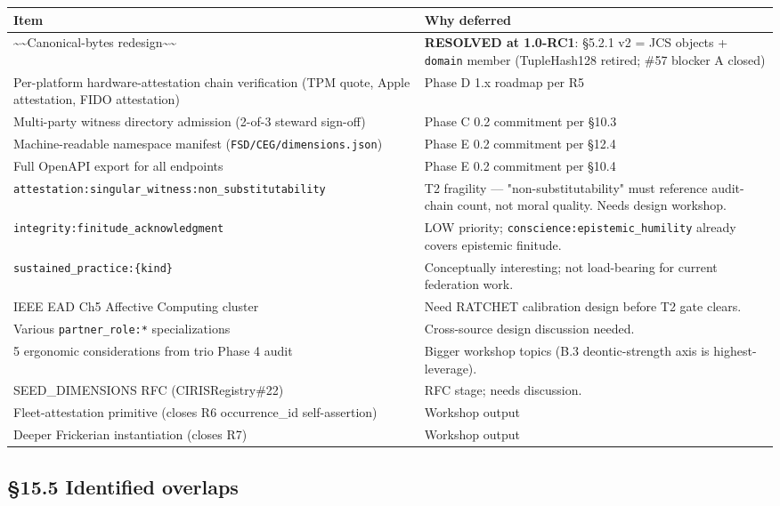 \documentclass[11pt]{article}
\begin{document}
{\footnotesize
\begin{longtable}{|p{8.0cm}|p{8.0cm}|}\hline
\textbf{Item} & \textbf{Why deferred} \\ \hline\endhead
\textasciitilde{}\textasciitilde{}Canonical-bytes redesign\textasciitilde{}\textasciitilde{} & \textbf{RESOLVED at 1.0-RC1}: §5.2.1 v2 = JCS objects + \texttt{domain} member (TupleHash128 retired; \#57 blocker A closed) \\ \hline
Per-platform hardware-attestation chain verification (TPM quote, Apple attestation, FIDO attestation) & Phase D 1.x roadmap per R5 \\ \hline
Multi-party witness directory admission (2-of-3 steward sign-off) & Phase C 0.2 commitment per §10.3 \\ \hline
Machine-readable namespace manifest (\texttt{FSD/CEG/dimensions.json}) & Phase E 0.2 commitment per §12.4 \\ \hline
Full OpenAPI export for all endpoints & Phase E 0.2 commitment per §10.4 \\ \hline
\texttt{attestation:singular\_witness:non\_substitutability} & T2 fragility — "non-substitutability" must reference audit-chain count, not moral quality. Needs design workshop. \\ \hline
\texttt{integrity:finitude\_acknowledgment} & LOW priority; \texttt{conscience:epistemic\_humility} already covers epistemic finitude. \\ \hline
\texttt{sustained\_practice:\{kind\}} & Conceptually interesting; not load-bearing for current federation work. \\ \hline
IEEE EAD Ch5 Affective Computing cluster & Need RATCHET calibration design before T2 gate clears. \\ \hline
Various \texttt{partner\_role:*} specializations & Cross-source design discussion needed. \\ \hline
5 ergonomic considerations from trio Phase 4 audit & Bigger workshop topics (B.3 deontic-strength axis is highest-leverage). \\ \hline
SEED\_DIMENSIONS RFC (CIRISRegistry\#22) & RFC stage; needs discussion. \\ \hline
Fleet-attestation primitive (closes R6 occurrence\_id self-assertion) & Workshop output \\ \hline
Deeper Frickerian instantiation (closes R7) & Workshop output \\ \hline
\end{longtable}}


\subsection*{§15.5 Identified overlaps}
\end{document}
